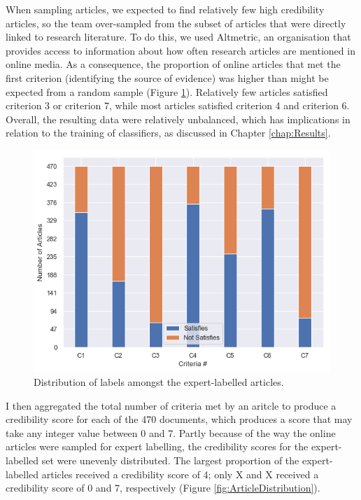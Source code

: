 \documentclass[a4paper,twoside,phd]{BYUPhys}
\begin{document}
When sampling articles, we expected to find relatively few high credibility articles, so the team over-sampled from the subset of articles that were directly linked to research literature. To do this, we used Altmetric, an organisation that provides access to information about how often research articles are mentioned in online media. As a consequence, the proportion of online articles that met the first criterion (identifying the source of evidence) was higher than might be expected from a random sample (Figure \ref{fig:LabelDistribution}). Relatively few articles satisfied criterion 3 or criterion 7, while most articles satisfied criterion 4 and criterion 6. Overall, the resulting data were relatively unbalanced, which has implications in relation to the training of classifiers, as discussed in Chapter \ref{chap:Results}.


\begin{figure}[H]
	\centering
	\includegraphics[totalheight=6cm]{images/label-distribution.png}
	\caption{Distribution of labels amongst the expert-labelled articles.}
	\label{fig:LabelDistribution}
\end{figure}


I then aggregated the total number of criteria met by an aritcle to produce a credibility score for each of the 470 documents, which produces a score that may take any integer value between 0 and 7. Partly because of the way the online articles were sampled for expert labelling, the credibility scores for the expert-labelled set were unevenly distributed. The largest proportion of the expert-labelled articles received a credibility score of 4; only X and X received a credibility score of 0 and 7, respectively (Figure \ref{fig:ArticleDistribution}).
\end{document}
